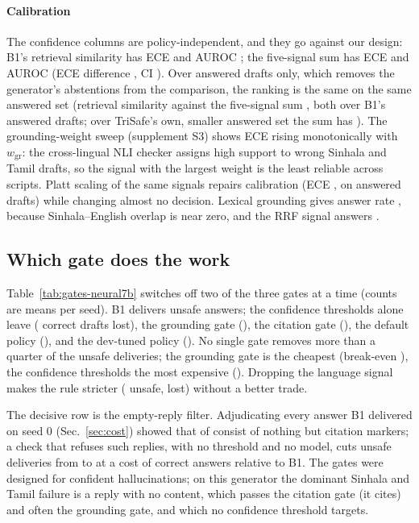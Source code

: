 \paragraph{Calibration} The confidence columns are policy-independent, and they go against our design: B1's retrieval similarity has ECE \LBoneEce{} and AUROC \LBoneAuroc; the five-signal sum has ECE \LTunEce{} and AUROC \LTunAuroc{} (ECE difference \LTunDeltaEce, CI \LTunDeltaEceCI). Over answered drafts only, which removes the generator's abstentions from the comparison, the ranking is the same on the same answered set (retrieval similarity \LBoneEceAns{} against the five-signal sum \LBtwoEceAns, both over B1's answered drafts; over TriSafe's own, smaller answered set the sum has \LTunEceAns). The grounding-weight sweep (supplement S3) shows ECE rising monotonically with $w_{\mathrm{gr}}$: the cross-lingual NLI checker assigns high support to wrong Sinhala and Tamil drafts, so the signal with the largest weight is the least reliable across scripts. Platt scaling of the same signals repairs calibration (ECE \LTPlattEce, \LTPlattEceAns{} on answered drafts) while changing almost no decision. Lexical grounding gives answer rate \LLexAns, because Sinhala--English overlap is near zero, and the RRF signal answers \LRrfAns.

\subsection{Which gate does the work}\label{sec:gates}

Table~\ref{tab:gates-neural7b} switches off two of the three gates at a time (counts are means per seed). B1 delivers \LBoneUnsafe{} unsafe answers; the confidence thresholds alone leave \LGateConfUnsafe{} (\LGateConfLost{} correct drafts lost), the grounding gate \LGateGrUnsafe{} (\LGateGrLost), the citation gate \LGateCitUnsafe{} (\LGateCitLost), the default policy \LDefUnsafe{} (\LDefLost), and the dev-tuned policy \LTunUnsafe{} (\LTunLost). No single gate removes more than a quarter of the unsafe deliveries; the grounding gate is the cheapest (break-even \LGateGrBreakEven), the confidence thresholds the most expensive (\LGateConfBreakEven). Dropping the language signal makes the rule stricter (\LNolangUnsafe{} unsafe, \LNolangLost{} lost) without a better trade.

The decisive row is the empty-reply filter. Adjudicating every answer B1 delivered on seed 0 (Sec.~\ref{sec:cost}) showed that \LAdjEmpty{} of \LAdjN{} consist of nothing but citation markers; a check that refuses such replies, with no threshold and no model, cuts unsafe deliveries from \LBoneUnsafe{} to \LBemptyUnsafe{} at a cost of \LBemptyLostVsBone{} correct answers relative to B1. The gates were designed for confident hallucinations; on this generator the dominant Sinhala and Tamil failure is a reply with no content, which passes the citation gate (it cites) and often the grounding gate, and which no confidence threshold targets.

